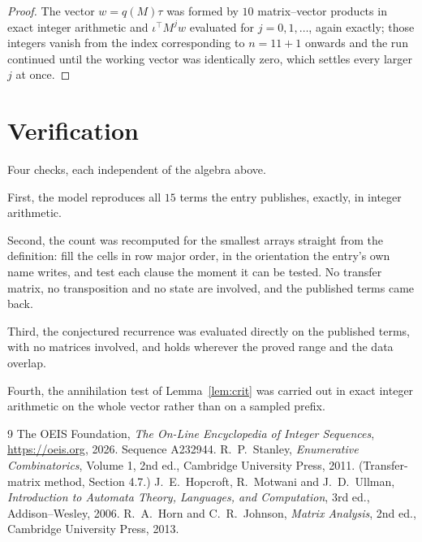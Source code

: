 \documentclass[11pt,a4paper]{article}
\theoremstyle{plain}
\theoremstyle{definition}
\begin{document}
\begin{proof}
The vector $w=q(M)\tau$ was formed by $10$ matrix--vector products in exact integer
arithmetic and $\iota^{\!\top}M^{j}w$ evaluated for $j=0,1,\dots$, again exactly; those
integers vanish from the index corresponding to $n=11+1$ onwards and the run continued
until the working vector was identically zero, which settles every larger $j$ at once.
\end{proof}

\section{Verification}

Four checks, each independent of the algebra above.

First, the model reproduces all $15$ terms the entry publishes, exactly, in integer
arithmetic.

Second, the count was recomputed for the smallest arrays straight from the definition: fill the
cells in row major order, in the orientation the entry's own name writes, and test each clause
the moment it can be tested. No transfer matrix, no transposition and no state are involved,
and the published terms came back.

Third, the conjectured recurrence was evaluated directly on the published terms, with no
matrices involved, and holds wherever the proved range and the data overlap.

Fourth, the annihilation test of Lemma~\ref{lem:crit} was carried out in exact integer
arithmetic on the whole vector rather than on a sampled prefix.

\begin{thebibliography}{9}
 The OEIS Foundation, \emph{The On-Line Encyclopedia of Integer
Sequences}, \url{https://oeis.org}, 2026. Sequence A232944.
 R.~P.~Stanley, \emph{Enumerative Combinatorics}, Volume 1, 2nd ed.,
Cambridge University Press, 2011. (Transfer-matrix method, Section 4.7.)
 J.~E.~Hopcroft, R.~Motwani and J.~D.~Ullman, \emph{Introduction to Automata
Theory, Languages, and Computation}, 3rd ed., Addison--Wesley, 2006.
 R.~A.~Horn and C.~R.~Johnson, \emph{Matrix Analysis}, 2nd ed., Cambridge
University Press, 2013.
\end{thebibliography}
\end{document}
